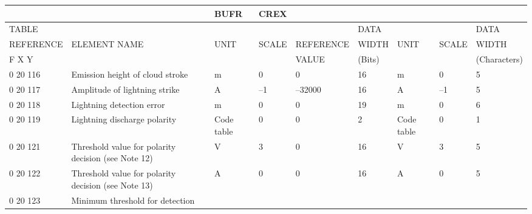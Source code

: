 \begin{longtable}[]{@{}lllllllll@{}}
\toprule
& & BUFR & CREX & & & & &\tabularnewline
\midrule
\endhead
TABLE & & & & & DATA & & & DATA\tabularnewline
REFERENCE & ELEMENT NAME & UNIT & SCALE & REFERENCE & WIDTH & UNIT & SCALE & WIDTH\tabularnewline
F X Y & & & & VALUE & (Bits) & & & (Characters)\tabularnewline
0 20 116 & Emission height of cloud stroke & m & 0 & 0 & 16 & m & 0 & 5\tabularnewline
0 20 117 & Amplitude of lightning strike & A & --1 & --32000 & 16 & A & --1 & 5\tabularnewline
0 20 118 & Lightning detection error & m & 0 & 0 & 19 & m & 0 & 6\tabularnewline
0 20 119 & Lightning discharge polarity & Code table & 0 & 0 & 2 & Code table & 0 & 1\tabularnewline
0 20 121 & Threshold value for polarity decision (see Note 12) & V & 3 & 0 & 16 & V & 3 & 5\tabularnewline
0 20 122 & Threshold value for polarity decision (see Note 13) & A & 0 & 0 & 16 & A & 0 & 5\tabularnewline
\begin{minipage}[t]{0.08\columnwidth}\raggedright
0 20 123\strut
\end{minipage} & \begin{minipage}[t]{0.08\columnwidth}\raggedright
Minimum threshold for detection


\end{minipage}
\end{longtable}
